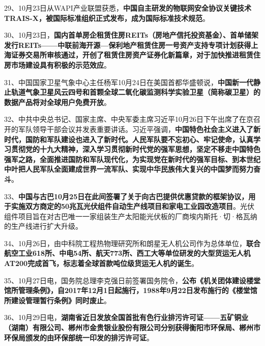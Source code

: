 {{29、10月23日从WAPI产业联盟获悉，}\textbf{{中国自主研发的物联网安全协议关键技术TRAIS-X，被国际标准组织正式发布，成为国际标准技术规范}}{。}}

{{30、10月23日，}\textbf{{国内首单房企租赁住房REITs（房地产信托投资基金）、首单储架发行REITs------中联前海开源---保利地产租赁住房一号资产支持专项计划获得上海证券交易所审核通过，开创了租赁住房资产证券化新篇章，对于加快推进租赁住房市场建设具有积极的示范效应}}{。}}

{{31、中国国家卫星气象中心主任杨军10月24日在美国首都华盛顿说，}\textbf{{中国新一代静止轨道气象卫星风云四号和首颗全球二氧化碳监测科学实验卫星（简称碳卫星）的数据产品将对全球用户免费开放}}{。}}

{{32、中共中央总书记、国家主席、中央军委主席习近平10月26日下午出席了在京召开的军队领导干部会议并发表重要讲话。习近平强调，}\textbf{{中国特色社会主义进入了新时代，国防和军队建设也进入了新时代。人民军队要不忘初心、牢记使命，认真学习贯彻党的十九大精神，深入学习贯彻新时代党的强军思想，坚定不移走中国特色强军之路，全面推进国防和军队现代化，为实现党在新时代的强军目标、到本世纪中叶把人民军队全面建成世界一流军队、实现中华民族伟大复兴的中国梦而努力奋斗}}{。}}

{{33、}\textbf{{中国与古巴10月25日在此间签署了关于向古巴提供优惠贷款的框架协议，用于实施双方商定的50兆瓦光伏组件自动生产线项目和家电工业园改造项目}}{。光伏组件项目旨在对古巴唯一一家组装生产太阳能光伏板的厂商埃内斯托·切·格瓦纳的生产线进行扩大升级。}}

{{34、10月26日，由中科院工程热物理研究所和朗星无人机公司作为总体单位，}\textbf{{联合航空工业618所、中电54所、航天773所、西工大等单位研发的大型货运无人机AT200完成首飞，标志着全球首款吨位级货运无人机的诞生}}{。}}

{{35、10月27日电，国务院总理李克强日前签署国务院令，}\textbf{{公布《机关团体建设楼堂馆所管理条例》，自2017年12月1日起施行，1988年9月22日发布施行的《楼堂馆所建设管理暂行条例》同时废止}}{。}}

{36、10月29日电，\textbf{{湖南省近日发放全国首批有色行业排污许可证------五矿铜业（湖南）有限公司、郴州市金贵银业股份有限公司分别获得衡阳市环保局、郴州市环保局颁发的由环保部统一印发的排污许可证}}。}
